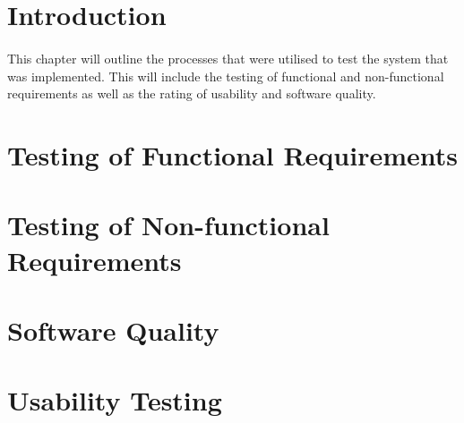 \section{Introduction}
	\paragraph{}{
	This chapter will outline the processes that were utilised to test the system that was implemented. This will include the testing of functional and non-functional requirements as well as the rating of usability and software quality.
	}
	
\section{Testing of Functional Requirements}
\section{Testing of Non-functional Requirements}
	
\section{Software Quality}
		
\section{Usability Testing}
	
	
